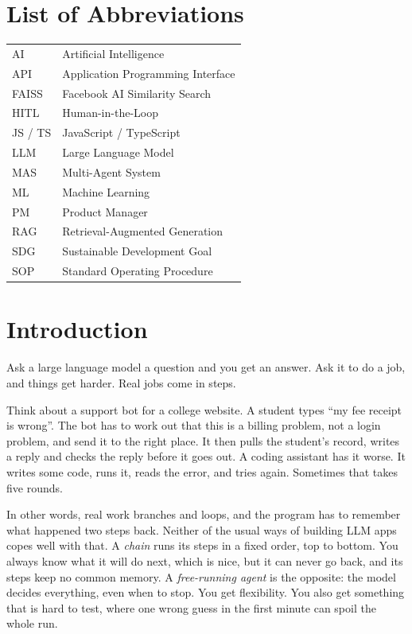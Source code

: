 \documentclass[12pt,a4paper]{report}
\begin{document}
\chapter*{List of Abbreviations}
\begin{tabular}{@{}L{3cm}L{11cm}@{}}
AI & Artificial Intelligence \\
API & Application Programming Interface \\
FAISS & Facebook AI Similarity Search \\
HITL & Human-in-the-Loop \\
JS / TS & JavaScript / TypeScript \\
LLM & Large Language Model \\
MAS & Multi-Agent System \\
ML & Machine Learning \\
PM & Product Manager \\
RAG & Retrieval-Augmented Generation \\
SDG & Sustainable Development Goal \\
SOP & Standard Operating Procedure \\
\end{tabular}

\newpage
\onehalfspacing

\chapter{Introduction}

Ask a large language model a question and you get an answer. Ask it to do a job, and things get harder. Real jobs come in steps.

Think about a support bot for a college website. A student types ``my fee receipt is wrong''. The bot has to work out that this is a billing problem, not a login problem, and send it to the right place. It then pulls the student's record, writes a reply and checks the reply before it goes out. A coding assistant has it worse. It writes some code, runs it, reads the error, and tries again. Sometimes that takes five rounds.

In other words, real work branches and loops, and the program has to remember what happened two steps back. Neither of the usual ways of building LLM apps copes well with that. A \emph{chain} runs its steps in a fixed order, top to bottom. You always know what it will do next, which is nice, but it can never go back, and its steps keep no common memory. A \emph{free-running agent} is the opposite: the model decides everything, even when to stop. You get flexibility. You also get something that is hard to test, where one wrong guess in the first minute can spoil the whole run.
\end{document}
